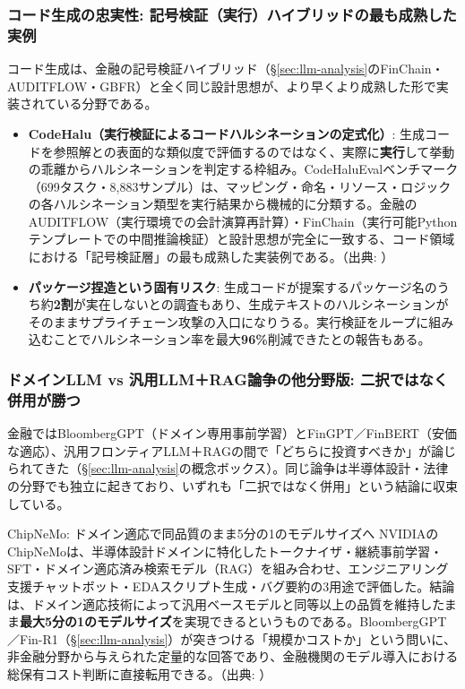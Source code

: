 \subsubsection{コード生成の忠実性: 記号検証（実行）ハイブリッドの最も成熟した実例}

コード生成は、金融の記号検証ハイブリッド（\S\ref{sec:llm-analysis}のFinChain・AUDITFLOW・GBFR）と全く同じ設計思想が、より早くより成熟した形で実装されている分野である。

\begin{itemize}
  \item \textbf{CodeHalu（実行検証によるコードハルシネーションの定式化）}: 生成コードを参照解との表面的な類似度で評価するのではなく、実際に\textbf{実行}して挙動の乖離からハルシネーションを判定する枠組み。CodeHaluEvalベンチマーク（699タスク・8,883サンプル）は、マッピング・命名・リソース・ロジックの各ハルシネーション類型を実行結果から機械的に分類する。金融のAUDITFLOW（実行環境での会計演算再計算）・FinChain（実行可能Pythonテンプレートでの中間推論検証）と設計思想が完全に一致する、コード領域における「記号検証層」の最も成熟した実装例である。（出典: \cite{y05codehalu2024}）
  \item \textbf{パッケージ捏造という固有リスク}: 生成コードが提案するパッケージ名のうち約\textbf{2割}が実在しないとの調査もあり、生成テキストのハルシネーションがそのままサプライチェーン攻撃の入口になりうる。実行検証をループに組み込むことでハルシネーション率を最大\textbf{96\%}削減できたとの報告もある。
\end{itemize}

\subsubsection{ドメインLLM vs 汎用LLM＋RAG論争の他分野版: 二択ではなく併用が勝つ}

金融ではBloombergGPT（ドメイン専用事前学習）とFinGPT／FinBERT（安価な適応）、汎用フロンティアLLM＋RAGの間で「どちらに投資すべきか」が論じられてきた（\S\ref{sec:llm-analysis}の概念ボックス）。同じ論争は半導体設計・法律の分野でも独立に起きており、いずれも「二択ではなく併用」という結論に収束している。

\begin{casestudy}{ChipNeMo: ドメイン適応で同品質のまま5分の1のモデルサイズへ}
NVIDIAのChipNeMoは、半導体設計ドメインに特化したトークナイザ・継続事前学習・SFT・ドメイン適応済み検索モデル（RAG）を組み合わせ、エンジニアリング支援チャットボット・EDAスクリプト生成・バグ要約の3用途で評価した。結論は、ドメイン適応技術によって汎用ベースモデルと同等以上の品質を維持したまま\textbf{最大5分の1のモデルサイズ}を実現できるというものである。BloombergGPT／Fin-R1（\S\ref{sec:llm-analysis}）が突きつける「規模かコストか」という問いに、非金融分野から与えられた定量的な回答であり、金融機関のモデル導入における総保有コスト判断に直接転用できる。（出典: \cite{y05chipnemo2023}）
\end{casestudy}

